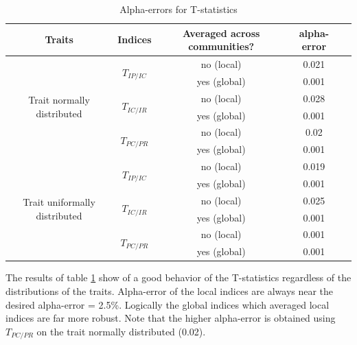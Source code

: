 \documentclass[12pt]{article}\usepackage[]{graphicx}\usepackage[]{color}
\begin{document}
\begin{table}[h!]
\begin{center}
\caption{Alpha-errors for T-statistics}
\label{tab:Alpha-errors_for_T-stats}
\begin{tabular}{|c|c|c|c|c|}
\hline
Traits & Indices & Averaged across communities? & alpha-error \tabularnewline
\hline \hline \hline
\multirow{6}{*}{Trait normally distributed} & \multirow{2}{*}{$T_{IP/IC}$} & no (local) & 0.021 \tabularnewline
\cline{3-4} 
 & & yes (global) & 0.001 \tabularnewline
\cline{2-4} 
 & \multirow{2}{*}{$T_{IC/IR}$} & no (local) & 0.028 \tabularnewline
\cline{3-4} 
 & & yes (global) & 0.001 \tabularnewline
\cline{2-4} 
 & \multirow{2}{*}{$T_{PC/PR}$} & no (local) & 0.02 \tabularnewline
\cline{3-4}
 & & yes (global)& 0.001 \tabularnewline

\hline \hline \hline

\multirow{6}{*}{Trait uniformally distributed} & \multirow{2}{*}{$T_{IP/IC}$} & no (local) & 0.019 \tabularnewline
\cline{3-4}
 & & yes (global) &  0.001 \tabularnewline
\cline{2-4} 
 & \multirow{2}{*}{$T_{IC/IR}$} & no (local) & 0.025 \tabularnewline
\cline{3-4} 
 & & yes (global) &  0.001 \tabularnewline
\cline{2-4} 
 & \multirow{2}{*}{$T_{PC/PR}$} & no (local) & 0.001 \tabularnewline
\cline{3-4} 
 & & yes (global)&  0.001 \tabularnewline
\hline 
\end{tabular}
\end{center}
\end{table}



The results of table \ref{tab:Alpha-errors_for_T-stats} show of a good behavior of the T-statistics regardless of the distributions of the traits. Alpha-error of the local indices are always near the desired alpha-error = 2.5\%. Logically the global indices which averaged local indices are far more robust. Note that the higher alpha-error is obtained using $T_{PC/PR}$ on the trait normally distributed (0.02).
\end{document}
